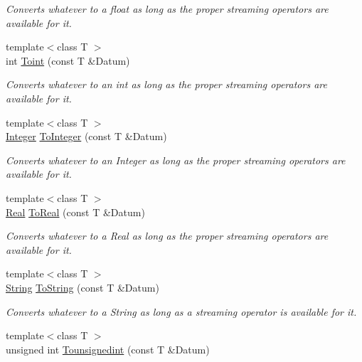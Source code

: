 \begin{DoxyCompactItemize}
\begin{DoxyCompactList}\small\item\em Converts whatever to a float as long as the proper streaming operators are available for it. \end{DoxyCompactList}\item 
{\footnotesize template$<$class T $>$ }\\int \hyperlink{namespaceMezzanine_a99ca5eae5b40d789f4ca7ddd3501a1f0}{Toint} (const T \&Datum)
\begin{DoxyCompactList}\small\item\em Converts whatever to an int as long as the proper streaming operators are available for it. \end{DoxyCompactList}\item 
{\footnotesize template$<$class T $>$ }\\\hyperlink{namespaceMezzanine_ac3576e52af3c62d13dde94829e0c5465}{Integer} \hyperlink{namespaceMezzanine_a2e13864ce278eef7ac4cdae9db669cc9}{To\-Integer} (const T \&Datum)
\begin{DoxyCompactList}\small\item\em Converts whatever to an Integer as long as the proper streaming operators are available for it. \end{DoxyCompactList}\item 
{\footnotesize template$<$class T $>$ }\\\hyperlink{namespaceMezzanine_a726731b1a7df72bf3583e4a97282c6f6}{Real} \hyperlink{namespaceMezzanine_a4b9d460e8d3b2403eb27647018283969}{To\-Real} (const T \&Datum)
\begin{DoxyCompactList}\small\item\em Converts whatever to a Real as long as the proper streaming operators are available for it. \end{DoxyCompactList}\item 
{\footnotesize template$<$class T $>$ }\\\hyperlink{namespaceMezzanine_acf9fcc130e6ebf08e3d8491aebcf1c86}{String} \hyperlink{namespaceMezzanine_ae8a13d6e385b9d270cbf37377b97e8a9}{To\-String} (const T \&Datum)
\begin{DoxyCompactList}\small\item\em Converts whatever to a String as long as a streaming operator is available for it. \end{DoxyCompactList}\item 
{\footnotesize template$<$class T $>$ }\\unsigned int \hyperlink{namespaceMezzanine_af589d9aee6cc9ed07c0dcc85b3495a13}{Tounsignedint} (const T \&Datum)

\end{DoxyCompactItemize}
